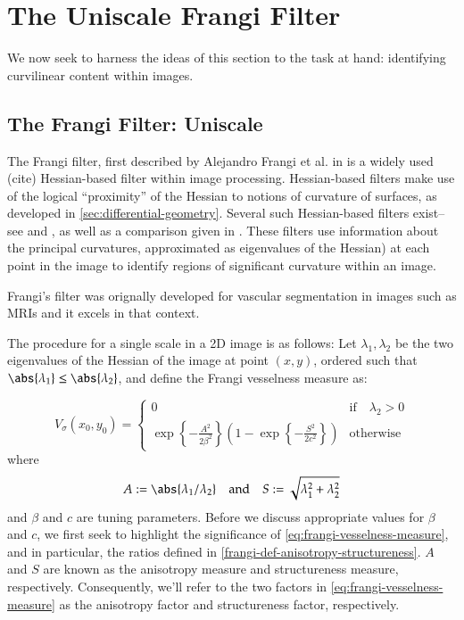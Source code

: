\chapter{The Uniscale Frangi Filter}

	We now seek to harness the ideas of this section to the task at hand: identifying curvilinear content within images.
\section{The Frangi Filter: Uniscale} \label{sec:frangi}

The Frangi filter, first described by Alejandro Frangi et al. in \cite{frangi-paper} is a widely used (cite) Hessian-based filter
within image processing. Hessian-based filters make use of the
logical ``proximity'' of the Hessian to notions of curvature of surfaces,
as developed in \cref{sec:differential-geometry}. 
Several such Hessian-based filters exist--see \cite{sato-filter} and \cite{lorenz-filter}, as well as a comparison given in \cite{olabarriaga-hessian-comparison}. These filters use information about the principal curvatures, approximated as eigenvalues of the Hessian) at each point in the image
to identify regions of significant curvature within an image.


Frangi's filter was orignally developed for vascular segmentation in images such as MRIs and it excels in that context.

The procedure for a single scale in a 2D image is as follows:
Let $\lambda_1, \lambda_2$ be the two eigenvalues of the Hessian of the image at point $(x, y)$,
ordered such that $\abs{\lambda_1} \leq \abs{\lambda_2}$, and define the Frangi vesselness measure %
as:

\begin{equation} \label{eq:frangi-vesselness-measure}
V_\sigma(x_0,y_0) = \begin{cases}
0 & \text{if} \quad \lambda_2 > 0 \\
\exp\left\{-\frac{A^2}{2\beta^2}\right\}
\left(1 - \exp\left\{-\frac{S^2}{2c^2}\right\}\right) & \text{otherwise}
\end{cases} \end{equation}
where
\begin{equation} \label{frangi-def-anisotropy-structureness}
A := \abs{\lambda_1 / \lambda_2}
\quad \textrm{and} \quad 
S := \sqrt{\lambda_1^2 + \lambda_2^2}
\end{equation}
and $\beta$ and $c$ are tuning parameters. Before we discuss appropriate values for $\beta$ and $c$, we first seek to highlight the significance of \cref{eq:frangi-vesselness-measure}, and in particular, the ratios defined in
\cref{frangi-def-anisotropy-structureness}. $A$ and $S$ are known as the anisotropy measure and structureness measure, respectively. Consequently, we'll refer to the two factors in \cref{eq:frangi-vesselness-measure} as the anisotropy factor and structureness factor, respectively. 

